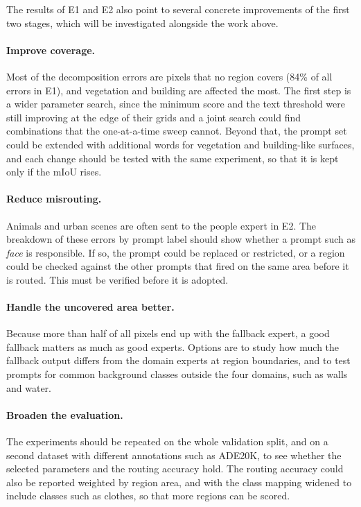 \documentclass{FastFyp}
\begin{document}
The results of E1 and E2 also point to several concrete improvements of the
first two stages, which will be investigated alongside the work above.

\paragraph{Improve coverage.} Most of the decomposition errors are pixels that no region covers (84\% of all errors in E1), and vegetation and building are affected the most. The first step is a wider parameter search, since the minimum score and the text threshold were still improving at the edge of their grids and a joint search could find combinations that the one-at-a-time sweep cannot. Beyond that, the prompt set could be extended with additional words for vegetation and building-like surfaces, and each change should be tested with the same experiment, so that it is kept only if the mIoU rises.

\paragraph{Reduce misrouting.} Animals and urban scenes are often sent to the people expert in E2. The breakdown of these errors by prompt label should show whether a prompt such as \textit{face} is responsible. If so, the prompt could be replaced or restricted, or a region could be checked against the other prompts that fired on the same area before it is routed. This must be verified before it is adopted.

\paragraph{Handle the uncovered area better.} Because more than half of all pixels end up with the fallback expert, a good fallback matters as much as good experts. Options are to study how much the fallback output differs from the domain experts at region boundaries, and to test prompts for common background classes outside the four domains, such as walls and water.

\paragraph{Broaden the evaluation.} The experiments should be repeated on the whole validation split, and on a second dataset with different annotations such as ADE20K, to see whether the selected parameters and the routing accuracy hold. The routing accuracy could also be reported weighted by region area, and with the class mapping widened to include classes such as clothes, so that more regions can be scored.
\end{document}
